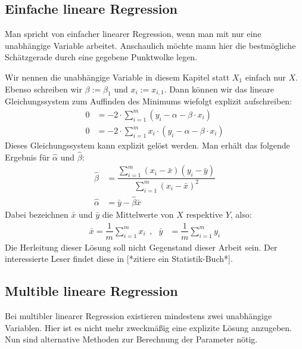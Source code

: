 \subsection{Einfache lineare Regression}

Man spricht von einfacher linearer Regression, wenn man mit nur eine unabhängige Variable arbeitet. Anschaulich möchte mann hier die bestmögliche Schätzgerade durch eine gegebene Punktwolke legen.

Wir nennen die unabhängige Variable in diesem Kapitel statt $X_1$ einfach nur $X$. Ebenso schreiben wir $\beta := \beta_1$ und $x_i := x_{i, 1}$. Dann können wir das lineare Gleichungssystem zum Auffinden des Minimums wiefolgt explizit aufschreiben:
\begin{align*}
    0 &= - 2 \cdot \sum_{i=1}^m (y_i - \alpha - \beta \cdot x_i)\\
    0 &= - 2 \cdot \sum_{i=1}^m x_i \cdot (y_i - \alpha - \beta \cdot x_i)
\end{align*}
Dieses Gleichungssystem kann explizit gelöst werden. Man erhält das folgende Ergebnis für $\hat\alpha$ und $\hat\beta$:
\begin{align*}
    \hat\beta &= \dfrac{\sum\limits_{i=1}^m (x_i - \bar x)(y_i - \bar y)}{\sum\limits_{i=1}^m (x_i - \bar x)^2}\\
    \hat\alpha &= \bar y - \hat\beta \bar x
\end{align*}
Dabei bezeichnen $\bar x$ und $\bar y$ die Mittelwerte von $X$ respektive $Y$, also:
\begin{align*}
    \bar x = \dfrac{1}{m} \sum_{i=1}^m x_i ~~,~~~ \bar y &= \dfrac{1}{m} \sum_{i=1}^m y_i
\end{align*}
Die Herleitung dieser Lösung soll nicht Gegenstand dieser Arbeit sein. Der interessierte Leser findet diese in [*zitiere ein Statistik-Buch*].

\subsection{Multible lineare Regression}

Bei multibler linearer Regression existieren mindestens zwei unabhängige Variablen. Hier ist es nicht mehr zweckmäßig eine explizite Lösung anzugeben. Nun sind alternative Methoden zur Berechnung der Parameter nötig.

